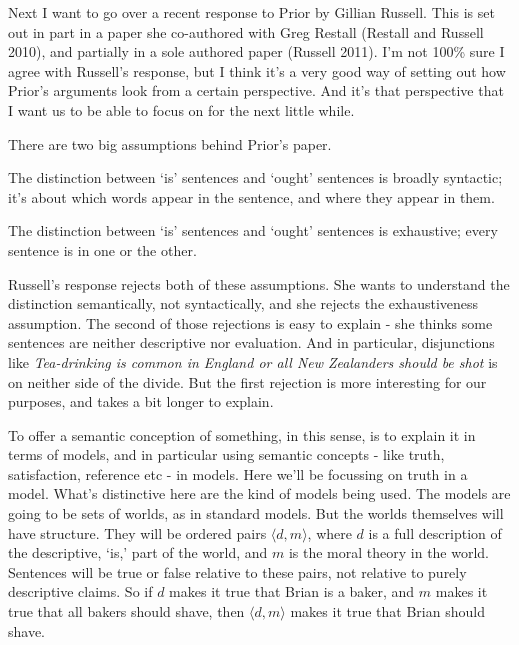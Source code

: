 \documentclass[
]{article}
\providecommand{\tightlist}{%
  \setlength{\itemsep}{0pt}\setlength{\parskip}{0pt}}
\begin{document}
Next I want to go over a recent response to Prior by Gillian Russell.
This is set out in part in a paper she co-authored with Greg Restall
(Restall and Russell 2010), and partially in a sole authored paper
(Russell 2011). I'm not 100\% sure I agree with Russell's response, but
I think it's a very good way of setting out how Prior's arguments look
from a certain perspective. And it's that perspective that I want us to
be able to focus on for the next little while.

There are two big assumptions behind Prior's paper.

\begin{description}
\tightlist
\item[Syntactic Distinction]
The distinction between `is' sentences and `ought' sentences is broadly
syntactic; it's about which words appear in the sentence, and where they
appear in them.
\item[Exhaustive Distinction]
The distinction between `is' sentences and `ought' sentences is
exhaustive; every sentence is in one or the other.
\end{description}

Russell's response rejects both of these assumptions. She wants to
understand the distinction semantically, not syntactically, and she
rejects the exhaustiveness assumption. The second of those rejections is
easy to explain - she thinks some sentences are neither descriptive nor
evaluation. And in particular, disjunctions like \emph{Tea-drinking is
common in England or all New Zealanders should be shot} is on neither
side of the divide. But the first rejection is more interesting for our
purposes, and takes a bit longer to explain.

To offer a semantic conception of something, in this sense, is to
explain it in terms of models, and in particular using semantic concepts
- like truth, satisfaction, reference etc - in models. Here we'll be
focussing on truth in a model. What's distinctive here are the kind of
models being used. The models are going to be sets of worlds, as in
standard models. But the worlds themselves will have structure. They
will be ordered pairs \(\langle d, m \rangle\), where \(d\) is a full
description of the descriptive, `is,' part of the world, and \(m\) is
the moral theory in the world. Sentences will be true or false relative
to these pairs, not relative to purely descriptive claims. So if \(d\)
makes it true that Brian is a baker, and \(m\) makes it true that all
bakers should shave, then \(\langle d, m \rangle\) makes it true that
Brian should shave.
\end{document}
